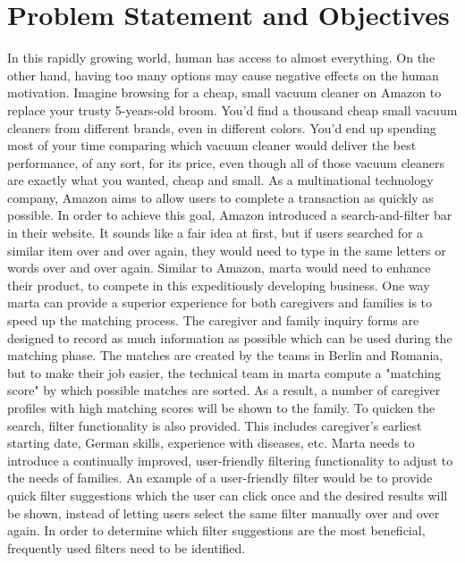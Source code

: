 \section{Problem Statement and Objectives}
In this rapidly growing world, human has access to almost everything. On the other hand, having too many options may cause negative effects on the human motivation. Imagine browsing for a cheap, small vacuum cleaner on Amazon to replace your trusty 5-years-old broom. You'd find a thousand cheap small vacuum cleaners from different brands, even in different colors. You'd end up spending most of your time comparing which vacuum cleaner would deliver the best performance, of any sort, for its price, even though all of those vacuum cleaners are exactly what you wanted, cheap and small. As a multinational technology company, Amazon aims to allow users to complete a transaction as quickly as possible. In order to achieve this goal, Amazon introduced a search-and-filter bar in their website. It sounds like a fair idea at first, but if users searched for a similar item over and over again, they would need to type in the same letters or words over and over again.
Similar to Amazon, marta would need to enhance their product, to compete in this expeditiously developing business. One way marta can provide a superior experience for both caregivers and families is to speed up the matching process. The caregiver and family inquiry forms are designed to record as much information as possible which can be used during the matching phase. The matches are created by the teams in Berlin and Romania, but to make their job easier, the technical team in marta compute a "matching score" by which possible matches are sorted. As a result, a number of caregiver profiles with high matching scores will be shown to the family. To quicken the search, filter functionality is also provided. This includes caregiver's earliest starting date, German skills, experience with diseases, etc.
Marta needs to introduce a continually improved, user-friendly filtering functionality to adjust to the needs of families. An example of a user-friendly filter would be to provide quick filter suggestions which the user can click once and the desired results will be shown, instead of letting users select the same filter manually over and over again. In order to determine which filter suggestions are the most beneficial, frequently used filters need to be identified.

